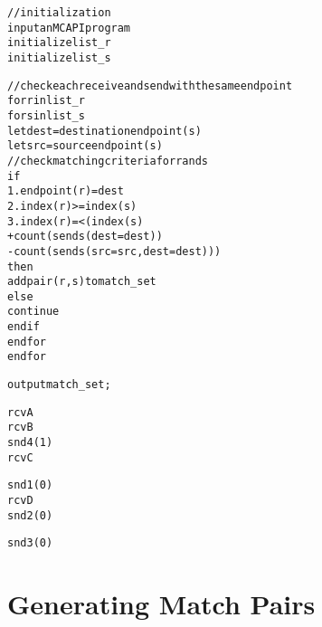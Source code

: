 
\newsavebox{\boxalgorithm}
\begin{lrbox}{\boxalgorithm}
\begin{minipage}[c]{1.4\linewidth}
\begin{alltt}
// initialization
input an MCAPI program
initialize list_r
initialize list_s

// check each receive and send with the same endpoint
for r in list_r
  for s in list_s
    let dest = destination endpoint(s)
    let src = source endpoint(s)
    // check matching criteria for r and s
    if
      1. endpoint(r) = dest
      2. index(r) >= index(s)
      3. index(r) =< (index(s) 
                     + count(sends(dest=dest))
                     - count(sends(src=src, dest=dest)))
    then
      add pair (r, s) to match_set
    else
      continue
    end if
  end for
end for

output match_set;
\end{alltt}
\end{minipage}
\end{lrbox}

\newsavebox{\boxtaskzero}
\begin{lrbox}{\boxtaskzero}
\begin{minipage}[t]{0.2\linewidth}
\begin{alltt}
rcvA
rcvB
snd4(1)
rcvC
\end{alltt}
\end{minipage}
\end{lrbox}

\newsavebox{\boxtaskone}
\begin{lrbox}{\boxtaskone}
\begin{minipage}[t]{0.2\linewidth}
\begin{alltt}
snd1(0)
rcvD
snd2(0)
\end{alltt}
\end{minipage}
\end{lrbox}

\newsavebox{\boxtasktwo}
\begin{lrbox}{\boxtasktwo}
\begin{minipage}[t]{0.2\linewidth}
\begin{alltt}
snd3(0)
\end{alltt}
\end{minipage}
\end{lrbox}

\section{Generating Match Pairs} \label{sec:mp-gen}

